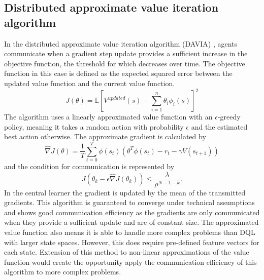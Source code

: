 \subsection{Distributed approximate value iteration algorithm}
In the distributed approximate value iteration algorithm (DAVIA) \cite{DAVIA}, agents communicate when a gradient step update provides a sufficient increase in the objective function, the threshold for which decreases over time. The objective function in this case is defined as the expected squared error between the updated value function and the current value function. 
\begin{equation*}
    J(\theta) = \mathbb{E}[V^{updated}(s) - \sum_{i=1}^n \theta_i \phi_i(s)]^2
\end{equation*} 
The algorithm uses a linearly approximated value function with an $\epsilon$-greedy policy, meaning it takes a random action with probability $\epsilon$ and the estimated best action otherwise.
The approximate gradient is calculated by
\begin{equation*}
    \hat{\nabla}J(\theta) = \frac{1}{T} \sum^T_{t=0} \phi(s_t)(\theta^T \phi(s_t) - r_t - \gamma V(s_{t+1}))
\end{equation*}
and the condition for communication is represented by 
\begin{equation*}
    J(\theta_k - \epsilon \hat{\nabla}J(\theta_k)) \leq \frac{\lambda}{\rho^{N-1-k}}.
\end{equation*}
In the central learner the gradient is updated by the mean of the transmitted gradients. This algorithm is guaranteed to converge under technical assumptions and shows good communication efficiency as the gradients are only communicated when they provide a sufficient update and are of constant size. The approximated value function also means it is able to handle more complex problems than DQL with larger state spaces. However, this does require pre-defined feature vectors for each state. Extension of this method to non-linear approximations of the value function would create the opportunity apply the communication efficiency of this algorithm to more complex problems.

